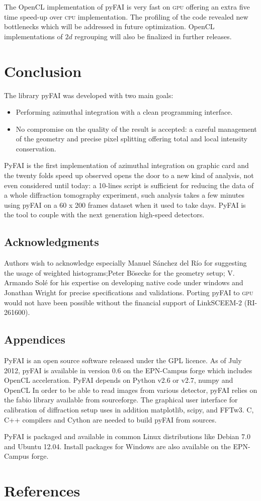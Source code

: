 \documentclass[a4paper]{jpconf}
\begin{document}
The OpenCL implementation of pyFAI is very fast on \textsc{gpu} offering an extra five
time speed-up over \textsc{cpu} implementation. The profiling of the code revealed new
bottlenecks which will be addressed in future optimization. OpenCL
implementations of $2d$ regrouping will also be finalized in further releases.

\section{Conclusion}
The library pyFAI was developed with two main goals:
\begin{itemize}
\item Performing azimuthal integration with a clean programming interface.
\item No compromise on the quality of the result is accepted: a careful
management of the geometry and precise pixel splitting offering total and local intensity
conservation.
\end{itemize}
PyFAI is the first implementation of azimuthal integration on
graphic card and the twenty folds speed up observed opens the
door to a new kind of analysis, not even considered until today:
a 10-lines script is sufficient for reducing the data of a whole diffraction
tomography experiment, such analysis takes a few minutes using pyFAI on
a 60 x 200 frames dataset when it used to take days.
PyFAI is the tool to couple with the next generation high-speed detectors.

\subsection*{Acknowledgments}
Authors wish to acknowledge especially Manuel S\'anchez del R\'io for suggesting
the usage of weighted histograms;Peter B\"osecke for the geometry setup;
V. Armando Sol\'e for his expertise on developing native code under windows and
Jonathan Wright for precise specifications and validations. Porting
pyFAI to \textsc{gpu} would not have been possible without the financial support of LinkSCEEM-2 (RI-261600).

\subsection*{Appendices}
PyFAI is an open source software released under the GPL licence.
As of July 2012, pyFAI is available in version 0.6 on the EPN-Campus
forge\cite{forge} which includes OpenCL acceleration.
PyFAI depends on Python v2.6 or v2.7, numpy\cite{numpy} and OpenCL\cite{opencl}
In order to be able to read images from various detector, pyFAI relies on the
fabio\cite{fabio} library available from sourceforge. The graphical user
interface for calibration of diffraction setup uses in addition
matplotlib\cite{matplotlib}, scipy\cite{scipy}, and FFTw3\cite{fftw}.
C, C++ compilers and Cython\cite{cython} are needed to build pyFAI from
sources.

PyFAI is packaged and available in common Linux distributions like Debian
7.0 and Ubuntu 12.04. Install packages for Windows are also
available on the EPN-Campus forge.

 \section*{References}


\end{document}
